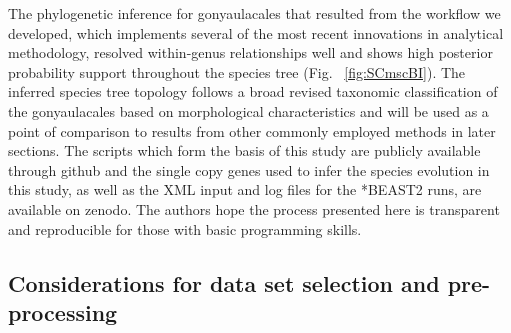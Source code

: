 \documentclass[fleqn,10pt,lineno]{wlpeerj} %
\begin{document}
The phylogenetic inference for gonyaulacales that resulted from the workflow we developed, which implements several of the most recent innovations in analytical methodology, resolved within-genus relationships well and shows high posterior probability support throughout the species tree (Fig. ~\ref{fig:SCmscBI}). 
The inferred species tree topology follows a broad revised taxonomic classification of the gonyaulacales based on morphological characteristics \cite{hoppenrath2017dinoflagellate} and will be used as a point of comparison to results from other commonly employed methods in later sections. 
The scripts which form the basis of this study are publicly available through github and the single copy genes used to infer the species evolution in this study, as well as the XML input and log files for the *BEAST2 runs, are available on zenodo. 
The authors hope the process presented here is transparent and reproducible for those with basic programming skills. 

\subsection*{Considerations for data set selection and pre-processing}
\end{document}
